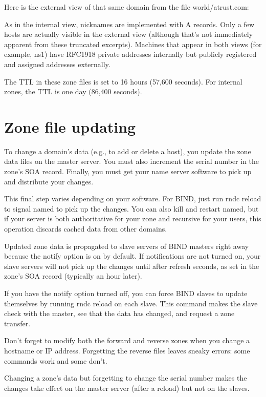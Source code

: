 Here is the external view of that same domain from the file
{world/atrust.com}:


As in the internal view, nicknames are implemented with A records. Only
a few hosts are actually visible in the external view (although that's
not immediately apparent from these truncated excerpts). Machines that
appear in both views (for example, ns1) have RFC1918 private addresses
internally but publicly registered and assigned addresses externally.

The TTL in these zone files is set to 16 hours (57,600 seconds). For
internal zones, the TTL is one day (86,400 seconds).




\section{Zone file updating}

To change a domain's data (e.g., to add or delete a host), you update
the zone data files on the master server. You must also increment the
serial number in the zone's SOA record. Finally, you must get your name
server software to pick up and distribute your changes.

This final step varies depending on your software. For BIND, just run
{rndc} {reload }to signal {named} to pick up the changes. You can also
kill and restart {named}, but if your server is both authoritative for
your zone and recursive for your users, this operation discards cached
data from other domains.

Updated zone data is propagated to slave servers of BIND masters right
away because the {notify} option is on by default. If notifications are
not turned on, your slave servers will not pick up the changes until
after {refresh} seconds, as set in the zone's SOA record (typically an
hour later).

If you have the {notify} option turned off, you can force BIND slaves to
update themselves by running {rndc reload} on each slave. This command
makes the slave check with the master, see that the data has changed,
and request a zone transfer.

Don't forget to modify both the forward and reverse zones when you
change a hostname or IP address. Forgetting the reverse files leaves
sneaky errors: some commands work and some don't.

Changing a zone's data but forgetting to change the serial number makes
the changes take effect on the master server (after a reload) but not on
the slaves.

